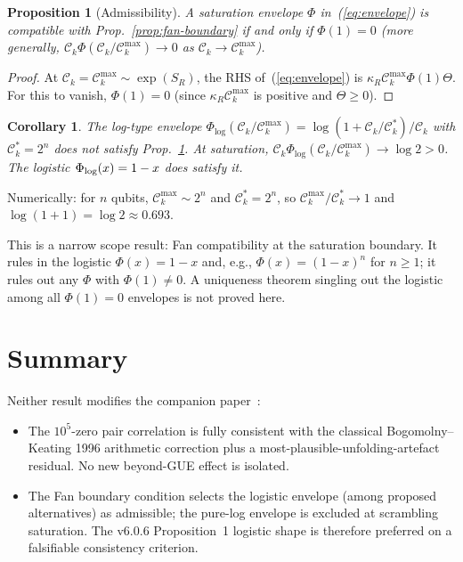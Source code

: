 \documentclass[aps,prd,superscriptaddress,nofootinbib,floatfix,10pt]{revtex4-2}
\newtheorem{proposition}{Proposition}
\newtheorem{corollary}{Corollary}
\newcommand{\Ck}{\mathcal{C}_{k}}
\newcommand{\kR}{\kappa_{R}}
\begin{document}
\begin{proposition}[Admissibility]
\label{prop:admis}
A saturation envelope $\Phi$ in~(\ref{eq:envelope}) is compatible with
Prop.~\ref{prop:fan-boundary} if and only if
$\Phi(1) = 0$ (more generally, $\Ck \Phi(\Ck/\Ck^{\max}) \to 0$ as
$\Ck \to \Ck^{\max}$).
\end{proposition}

\begin{proof}
At $\Ck = \Ck^{\max} \sim \exp(S_{R})$, the RHS of~(\ref{eq:envelope})
is $\kR \Ck^{\max} \Phi(1) \Theta$. For this to vanish, $\Phi(1) = 0$
(since $\kR \Ck^{\max}$ is positive and $\Theta \ge 0$).
\end{proof}

\begin{corollary}
\label{cor:log-fails}
The log-type envelope
$\Phi_{\log}(\Ck/\Ck^{\max}) = \log(1 + \Ck/\Ck^{\ast})/\Ck$
with $\Ck^{\ast} = 2^{n}$ does not satisfy Prop.~\ref{prop:admis}. At
saturation, $\Ck \Phi_{\log}(\Ck/\Ck^{\max}) \to \log 2 > 0$.
The logistic $\Phi_{\rm log}(x) = 1 - x$ does satisfy it.
\end{corollary}

Numerically: for $n$ qubits, $\Ck^{\max} \sim 2^{n}$ and
$\Ck^{\ast} = 2^{n}$, so
$\Ck^{\max}/\Ck^{\ast} \to 1$ and
$\log(1+1) = \log 2 \approx 0.693$.

This is a narrow scope result: Fan compatibility at the saturation
boundary. It rules in the logistic $\Phi(x) = 1-x$ and, e.g.,
$\Phi(x) = (1-x)^{n}$ for $n\ge 1$; it rules out any $\Phi$ with
$\Phi(1)\neq 0$. A uniqueness theorem singling out the logistic among
all $\Phi(1)=0$ envelopes is not proved here.

\section{Summary}

Neither result modifies the companion paper~\cite{Remondiere2026ECIv6}:
\begin{itemize}
 \item The $10^{5}$-zero pair correlation is fully consistent with the
   classical Bogomolny--Keating 1996 arithmetic correction plus a
   most-plausible-unfolding-artefact residual. No new beyond-GUE
   effect is isolated.
 \item The Fan boundary condition selects the logistic envelope (among
   proposed alternatives) as admissible; the pure-log envelope is
   excluded at scrambling saturation. The v6.0.6 Proposition~1 logistic
   shape is therefore preferred on a falsifiable consistency
   criterion.
\end{itemize}
\end{document}
